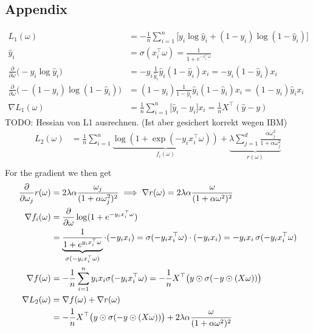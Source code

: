 \documentclass{article}
\begin{document}
\subsection{Appendix}
\begin{align*}
L_1(\omega) &= -\frac{1}{n} \sum_{i=1}^n \Big[y_i \log \hat{y}_i + (1 - y_i) \log (1 - \hat{y}_i)\Big] \\
\hat{y}_i &= \sigma(x_i^\top \omega) = \frac{1}{1 + e^{-x_i^\top \omega}} \\
\frac{\partial}{\partial \omega} \big(-y_i \log \hat{y}_i\big) &= -y_i \frac{1}{\hat{y}_i} \hat{y}_i (1 - \hat{y}_i) x_i = -y_i (1 - \hat{y}_i) x_i \\
\frac{\partial}{\partial \omega} \big(-(1 - y_i) \log (1 - \hat{y}_i)\big) &= (1 - y_i) \frac{1}{1 - \hat{y}_i} \hat{y}_i (1 - \hat{y}_i) x_i = (1 - y_i) \hat{y}_i x_i \\
\nabla L_1(\omega) &= \frac{1}{n} \sum_{i=1}^n \big[\hat{y}_i - y_i\big] x_i = \frac{1}{n} X^\top (\hat{y} - y)
\end{align*}
TODO: Hessian von L1 ausrechnen. (Ist aber gesichert korrekt wegen IBM)
\begin{align*}
L_2(\omega) &= \frac{1}{n} \sum_{i=1}^n \underbrace{\log \left(1 + \exp(-y_i x_i^\top \omega)\right) }_{f_i(\omega)} + \underbrace{\lambda \sum_{j=1}^d \frac{\alpha \omega_j^2}{1 + \alpha \omega_j^2}}_{r(\omega)} \\
\end{align*}
For the gradient we then get
\begin{align*}
\frac{\partial}{\partial \omega_j} r(\omega) &= 2 \lambda \alpha \frac{\omega_j}{(1 + \alpha \omega_j^2)^2}
 \implies \nabla r(\omega) = 2 \lambda \alpha \frac{\omega}{(1 + \alpha \omega^2)^2} \\
%
\nabla f_i(\omega) &= \frac{\partial}{\partial \omega} \log(1 + e^{-y_i x_i^\top \omega}) \notag \\
&= \underbrace{\frac{1}{1 + e^{y_i x_i^\top \omega}}}_{\sigma(-y_i x_i^\top \omega)} \cdot (-y_i x_i) = \sigma(-y_i x_i^\top \omega) \cdot (-y_i x_i) = -y_i x_i \, \sigma(-y_i x_i^\top \omega) \notag\\
%
\nabla f(\omega) &= -\frac{1}{n} \sum_{i=1}^n y_i x_i \sigma(-y_i x_i^\top \omega) = -\frac{1}{n} X^\top \big(y \odot \sigma(-y \odot (X \omega))\big) \\
\nabla L_2(\omega) &= \nabla f(\omega) + \nabla r(\omega) \notag \\
 &= -\frac{1}{n} X^\top \big(y \odot \sigma(-y \odot (X \omega))\big) + 2 \lambda \alpha \frac{\omega}{(1 + \alpha \omega^2)^2}
\end{align*}
\end{document}
